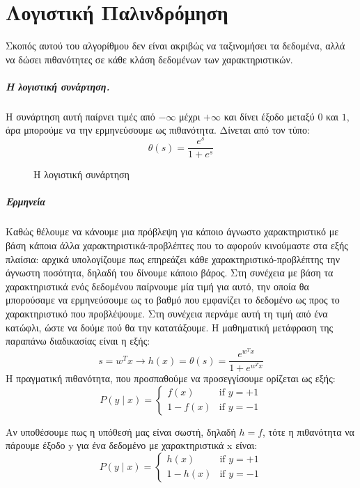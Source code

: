 \chapter{Λογιστική Παλινδρόμηση}
\label{appendix:LReg}
Σκοπός αυτού του αλγορίθμου δεν είναι ακριβώς να ταξινομήσει τα δεδομένα, αλλά να δώσει πιθανότητες σε κάθε κλάση δεδομένων των χαρακτηριστικών.
\paragraph{Η λογιστική συνάρτηση.} Η συνάρτηση αυτή παίρνει τιμές από $- \infty$ μέχρι $+ \infty$ και δίνει έξοδο μεταξύ $0$ και $1$, άρα μπορούμε να την ερμηνεύσουμε ως πιθανότητα. Δίνεται από τον τύπο:
$$\theta(s)=\frac{e^s}{1 + e^s}$$
\begin{figure}[H]
	\centering			
	\caption[Η λογιστική συνάρτηση]{Η λογιστική συνάρτηση}
\end{figure}

\paragraph{Ερμηνεία} Καθώς θέλουμε να κάνουμε μια πρόβλεψη για κάποιο άγνωστο χαρακτηριστικό με βάση κάποια άλλα χαρακτηριστικά-προβλέπτες που το αφορούν κινούμαστε στα εξής πλαίσια: αρχικά υπολογίζουμε πως επηρεάζει κάθε χαρακτηριστικό-προβλέπτης την άγνωστη ποσότητα, δηλαδή του δίνουμε κάποιο βάρος. Στη συνέχεια με βάση τα χαρακτηριστικά ενός δεδομένου παίρνουμε μία τιμή
για αυτό, την οποία θα μπορούσαμε να ερμηνεύσουμε ως το βαθμό που εμφανίζει το δεδομένο ως προς το χαρακτηριστικό που προβλέψουμε. Στη συνέχεια περνάμε αυτή τη τιμή  από ένα κατώφλι, ώστε να δούμε πού θα την κατατάξουμε. Η μαθηματική μετάφραση της παραπάνω διαδικασίας είναι η εξής:
$$s=w^T x \rightarrow h(x)=\theta(s)=\frac{e^{w^T x}}{1 + e^{w^T x} }$$
Η πραγματική πιθανότητα, που προσπαθούμε να προσεγγίσουμε  ορίζεται ως εξής:
$$P(y \mid x)=\left\{
\begin{array}{ll}
f(x)  & \mbox{if } y = +1 \\
1 - f(x)  & \mbox{if } y = -1
\end{array}
\right.$$

Αν υποθέσουμε πως η υπόθεσή μας είναι σωστή, δηλαδή $h=f$, τότε η πιθανότητα να πάρουμε έξοδο y για ένα δεδομένο με χαρακτηριστικά x είναι:
$$P(y \mid x)=\left\{
\begin{array}{ll}
h(x)  & \mbox{if } y = +1 \\
1 - h(x)  & \mbox{if } y = -1
\end{array}
\right.$$

